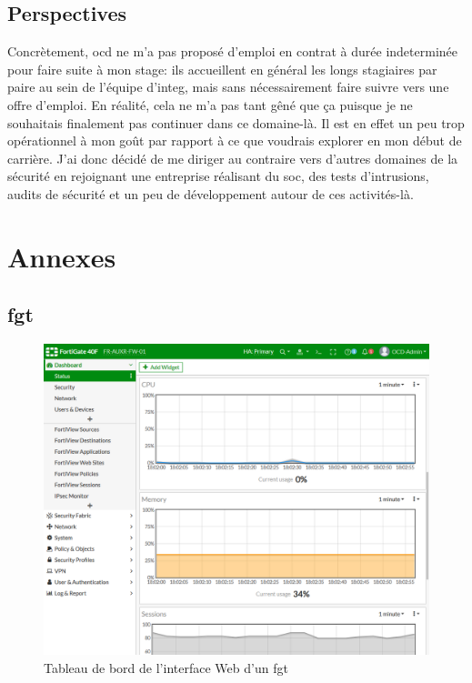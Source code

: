 \documentclass[12pt, oneside, a4paper, titlepage]{report}
\begin{document}
\section{Perspectives}%
\label{sec:conclu::persp}

Concrètement, \acrlong{ocd} ne m'a pas proposé d'emploi en contrat à durée
indeterminée pour faire suite à mon stage: ils accueillent en général les longs
stagiaires par paire au sein de l'équipe d'\gls{integ}, mais sans nécessairement
faire suivre vers une offre d'emploi. En réalité, cela ne m'a pas tant gêné que
ça puisque je ne souhaitais finalement pas continuer dans ce domaine-là. Il est
en effet un peu trop opérationnel à mon goût par rapport à ce que voudrais
explorer en mon début de carrière. J'ai donc décidé de me diriger au contraire
vers d'autres domaines de la sécurité en rejoignant une entreprise réalisant du
\gls{soc}, des tests d'intrusions, audits de sécurité et un peu de développement
autour de ces activités-là.


\chapter{Annexes}%
\label{cha:annexes}

\section{\acrlong{fgt}}%
\label{sec:annexes::fgt}

\begin{figure}[h!]
    \centering
    \includegraphics[width = \linewidth]{img/fgt-auxr/dashboard.png}
    \caption{Tableau de bord de l'interface Web d'un \acrlong{fgt}}%
    \label{fig:fgt-auxr/dashboard.png}
\end{figure}
\end{document}
